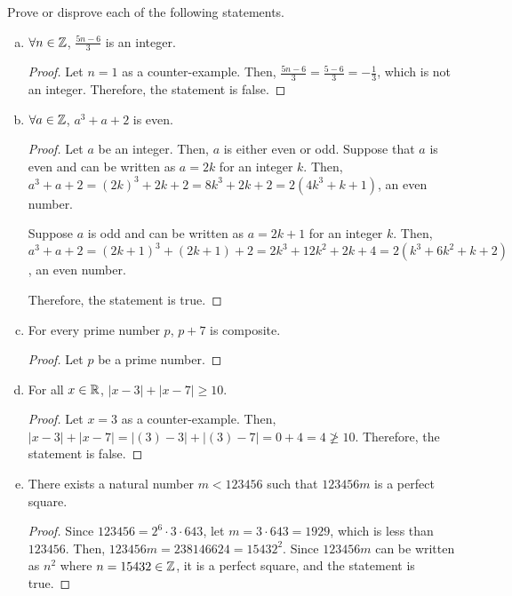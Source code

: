 \documentclass[11pt]{article}
\begin{document}
\question Prove or disprove each of the following statements.
\begin{enumerate}[(a)]
    \item $\forall n\in\mathbb{Z}$, $\frac{5n-6}{3}$ is an integer.
    \begin{proof}
        Let $n=1$ as a counter-example.
        Then, $\frac{5n-6}{3}=\frac{5-6}{3}=-\frac{1}{3}$, which is not an integer.
        Therefore, the statement is false.
    \end{proof}
    
    \item $\forall a\in\mathbb{Z}$, $a^3+a+2$ is even.
    \begin{proof}
        Let $a$ be an integer. Then, $a$ is either even or odd.
        Suppose that $a$ is even and can be written as $a=2k$ for an integer $k$.
        Then, $a^3+a+2=(2k)^3+2k+2=8k^3+2k+2=2(4k^3+k+1)$, an even number.
        
        Suppose $a$ is odd and can be written as $a=2k+1$ for an integer $k$.
        Then, $a^3+a+2 = (2k+1)^3 + (2k+1) + 2 = 2k^3 + 12k^2 + 2k + 4 = 2(k^3 + 6k^2 + k + 2)$, an even number.
        
        Therefore, the statement is true.
    \end{proof}
    
    \item For every prime number $p$, $p + 7$ is composite.
    \begin{proof}
        Let $p$ be a prime number. %
    \end{proof}
    
    \item For all $x \in \mathbb{R}$, $|x-3| + |x-7| \geq 10$.
    \begin{proof}
        Let $x=3$ as a counter-example.
        Then, $|x-3|+|x-7|=|(3)-3|+|(3)-7|=0+4=4 \not\geq 10$.
        Therefore, the statement is false.
    \end{proof}
    
    \item There exists a natural number $m < 123456$ such that $123456m$ is a perfect square.
    \begin{proof}
        Since $123456=2^6\cdot3\cdot643$, let $m=3\cdot643=1929$, which is less than $123456$.
        Then, $123456m=238146624=15432^2$.
        Since $123456m$ can be written as $n^2$ where $n=15432\in\mathbb{Z}$, it is a perfect square, and the statement is true.
    \end{proof}
    

\end{enumerate}
\end{document}
